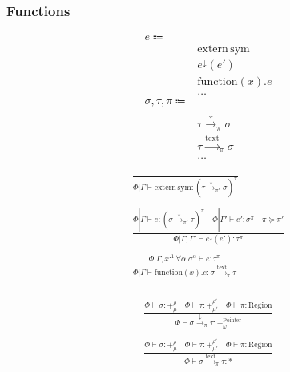 \documentclass {article}
\begin{document}
\subsubsection{Functions}

\begin{align*}
e \Coloneqq & \\
& \text{extern} \, \text{sym} \tag{Extern Function} \\
& e ^\downarrow (e') \tag{Function Pointer Application} \\
& \text{function} (x). e \tag{Function Literal} \\
& \dots \\
\sigma, \tau, \pi \Coloneqq & \\
& \tau \xrightarrow{\downarrow}_\pi \sigma \tag{Function Pointer}\\
& \tau \xrightarrow{\text{text}}_\pi \sigma  \tag{Function Literal Type} \\
& \dots
\end{align*}

\begin{gather*}
\frac
{}
{\Phi | \Gamma \vdash \text{extern} \, \text{sym} : (\tau \xrightarrow{\downarrow}_{\pi'} \sigma)^\pi} \\
\\
\frac
{\Phi | \Gamma \vdash e : (\sigma \xrightarrow{\downarrow}_{\pi'} \tau)^\pi \quad \Phi | \Gamma' \vdash e' : \sigma^\pi \quad \pi \succeq \pi'}
{\Phi | \Gamma, \Gamma' \vdash e^\downarrow (e') : \tau^\pi} \\
\\
\frac
{\Phi | \Gamma, x :^1 \forall \alpha. \sigma^\alpha \vdash e : \tau^\pi}
{\Phi | \Gamma \vdash \text{function}(x). e : \sigma \xrightarrow{\text{text}}_\pi \tau} \\
\end{gather*}

\begin{gather*}
\frac
{\Phi \vdash \sigma : +^{\rho}_\mu \quad \Phi \vdash \tau : +^{\rho'}_{\mu'} \quad \Phi \vdash \pi : \text{Region}}
{\Phi \vdash \sigma \xrightarrow{\downarrow}_\pi \tau : +^\text{Pointer}_\omega} \\
\\
\frac
{\Phi \vdash \sigma : +^{\rho}_\mu \quad \Phi \vdash \tau : +^{\rho'}_{\mu'} \quad \Phi \vdash \pi : \text{Region}}
{\Phi \vdash \sigma \xrightarrow{\text{text}}_\pi \tau : *} \\
\end{gather*}
\end{document}

